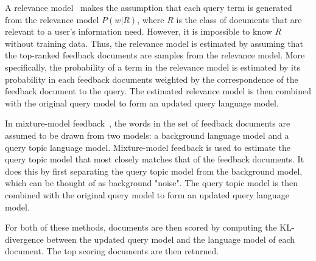 \documentclass[format=sigconf, screen=true, review=false]{acmart}
\begin{document}
A relevance model~\cite{10.1145/383952.383972} makes the assumption that each query term is generated from the relevance model $P(w|R)$, where $R$ is the class of documents that are relevant to a user's information need.
However, it is impossible to know $R$ without training data.
Thus, the relevance model is estimated by assuming that the top-ranked feedback documents are samples from the relevance model.
More specifically, the probability of a term in the relevance model is estimated by its probability in each feedback documents weighted by the correspondence of the feedback document to the query.
The estimated relevance model is then combined with the original query model to form an updated query language model.




In mixture-model feedback~\cite{10.1145/502585.502654}, the words in the set of feedback documents are assumed to be drawn from two models: a background language model and a query topic language model.
Mixture-model feedback is used to estimate the query topic model that most closely matches that of the feedback documents.
It does this by first separating the query topic model from the background model, which can be thought of as background "noise".
The query topic model is then combined with the original query model to form an updated query language model.

For both of these methods, documents are then scored by computing the KL-divergence between the updated query model and the language model of each document.
The top scoring documents are then returned.
\end{document}
